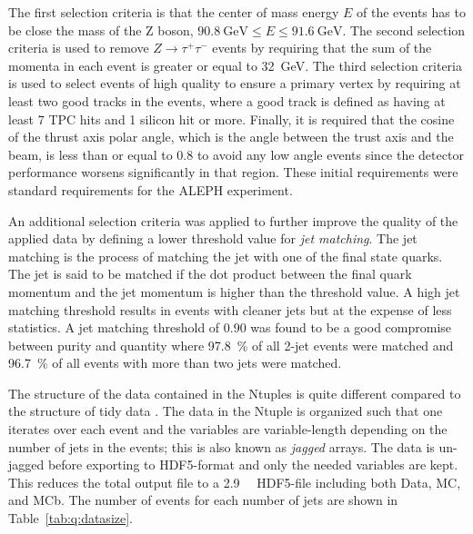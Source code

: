 The first selection criteria is that the center of mass energy $E$ of the events has to be close the mass of the Z boson, ${\SI{90.8}{\GeV} \leq E \leq \SI{91.6}{\GeV}}$. The second selection criteria is used to remove ${Z \rightarrow \tau^+ \tau^-}$ events by requiring that the sum of the momenta in each event is greater or equal to \SI{32}{\GeV}. The third selection criteria is used to select events of high quality to ensure a primary vertex by requiring at least two good tracks in the events, where a good track is defined as having at least \num{7} TPC hits and \num{1} silicon hit or more. Finally, it is required that the cosine of the thrust axis polar angle, which is the angle between the trust axis and the beam, is less than or equal to \num{0.8} to avoid any low angle events since the detector performance worsens significantly in that region. These initial requirements were standard requirements for the ALEPH experiment.

An additional selection criteria was applied to further improve the quality of the applied data by defining a lower threshold value for \emph{jet matching}. The jet matching is the process of matching the jet with one of the final state quarks. The jet is said to be matched if the dot product between the final quark momentum and the jet momentum is higher than the threshold value. A high jet matching threshold results in events with cleaner jets but at the expense of less statistics. A jet matching threshold of \num{0.90} was found to be a good compromise between purity and quantity where \SI{97.8}{\percent} of all 2-jet events were matched and \SI{96.7}{\percent} of all events with more than two jets were matched.  

The structure of the data contained in the Ntuples is quite different compared to the   structure of tidy data \autocite{JSSv059i10}. The data in the Ntuple is organized such that one iterates over each event and the variables are variable-length depending on the number of jets in the events; this is also known as \emph{jagged} arrays. The data is un-jagged before exporting to HDF5-format and only the needed variables are kept. This reduces the total output file to a \SI{2.9}{\giga\byte} HDF5-file including both Data, MC, and MCb. The number of events for each number of jets are shown in Table~\ref{tab:q:datasize}.

